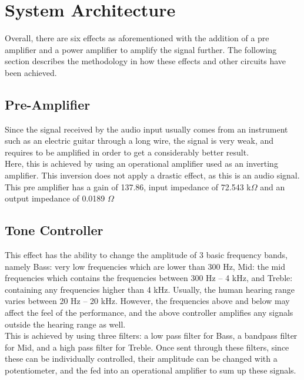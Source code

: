 \documentclass{article}
\begin{document}
	
	
	\section{System Architecture}
            Overall, there are six effects as aforementioned with the addition of a pre amplifier and a power amplifier to amplify the signal further. The following section describes the methodology in how these effects and other circuits have been achieved.

            \subsection{Pre-Amplifier}
                Since the signal received by the audio input usually comes from an instrument such as an electric guitar through a long wire, the signal is very weak, and requires to be amplified in order to get a considerably better result.\\

                Here, this is achieved by using an operational amplifier used as an inverting amplifier. This inversion does not apply a drastic effect, as this is an audio signal. This pre amplifier has a gain of 137.86, input impedance of 72.543 k$\Omega$ and an output impedance of 0.0189 $\Omega$

            \subsection{Tone Controller}
                This effect has the ability to change the amplitude of 3 basic frequency bands, namely Bass: very low frequencies which are lower than 300 Hz, Mid: the mid frequencies which contains the frequencies between 300 Hz – 4 kHz, and Treble: containing any frequencies higher than 4 kHz. Usually, the human hearing range varies between 20 Hz – 20 kHz. However, the frequencies above and below may affect the feel of the performance, and the above controller amplifies any signals outside the hearing range as well.\\
                
                This is achieved by using three filters: a low pass filter for Bass, a bandpass filter for Mid, and a high pass filter for Treble. Once sent through these filters, since these can be individually controlled, their amplitude can be changed with a potentiometer, and the fed into an operational amplifier to sum up these signals.\\                
                
\end{document}
